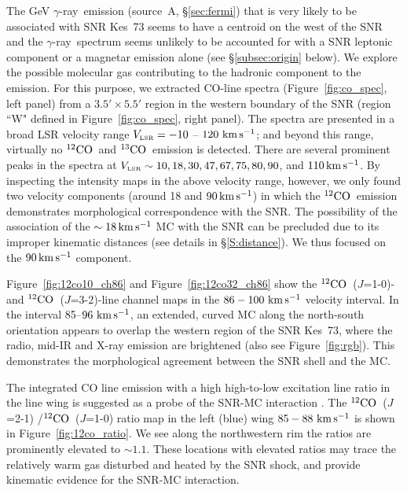 \documentclass[12pt,preprint]{aastex}
\newcommand{\ssst}{\scriptscriptstyle}
\newcommand{\kms}{\,{\km\ps}}       \newcommand{\m}{\,{\rm m}}
\newcommand{\VLSR}{V_{\ssst\rm LSR}}
\newcommand{\twCO}{$^{12}{\rm CO}$}
\newcommand{\thCO}{$^{13}{\rm CO}$}
\newcommand{\Jotz}{$J$=1-0}
\newcommand{\Jtto}{$J$=2-1}
\newcommand{\Jttt}{$J$=3-2}
\newcommand{\gray}{{\rm $\gamma$-ray}}
\begin{document}
The GeV \gray\ emission (source~A, \S\ref{sec:fermi}) 
that is very likely to be associated with SNR Kes~73
seems to have a centroid on the west of the SNR
and the \gray\ spectrum seems unlikely to be accounted for
with  a SNR leptonic component 
or a magnetar emission alone 
(see \S\ref{subsec:origin} below).
We explore the possible molecular gas contributing to the hadronic component
to the emission.
For this purpose, we extracted CO-line spectra (Figure~\ref{fig:co_spec}, left panel)
from a $3.5'\times5.5'$ region in the western boundary of the SNR (region ``W" defined in
Figure~\ref{fig:co_spec}, right panel).
The spectra are presented in a broad LSR velocity range
$\VLSR=-10$ -- $120\kms$; and
beyond this range, virtually no \twCO\ and \thCO\ emission is detected. 
There are several prominent peaks in the spectra at 
$\VLSR\sim10, 18, 30, 47, 67, 75, 80, 90$, and $110\,{\rm km}\,{\rm s}^{-1}$.
By inspecting the intensity maps in the above velocity range, however,
we only found two velocity components (around 18 and $90\,{\rm km}\,{\rm s}^{-1}$)
in which the \twCO\ emission demonstrates morphological correspondence with
the SNR.
The possibility of the association of the $\sim18\,{\rm km}\,{\rm s}^{-1}$ MC with the SNR can be
precluded due to its improper kinematic distances (see details in \S\ref{S:distance}).
We thus focused on the $90\,{\rm km}\,{\rm s}^{-1}$ component.

Figure~\ref{fig:12co10_ch86} and Figure~\ref{fig:12co32_ch86}
show the \twCO\ (\Jotz)- and \twCO~(\Jttt)-line channel maps
in the $86-100\kms$ velocity interval. %
In the interval 85--$96\kms$,  
an extended, curved MC along the north-south orientation appears to overlap
the western region of the SNR Kes~73, 
where the radio, mid-IR and X-ray emission are brightened
(also see Figure~\ref{fig:rgb}).
This demonstrates the morphological agreement between the SNR shell
and the MC.

The integrated CO line emission  with a high high-to-low excitation 
line ratio in the line wing is
suggested as a probe of the SNR-MC interaction 
\citep{Seta1998,Jiang20103c397,Chen2014IAU}.
The   \twCO~(\Jtto) /\twCO~(\Jotz) ratio map in the left (blue) wing $85-88\kms$ 
is shown in Figure~\ref{fig:12co_ratio}. 
We see along the northwestern rim the ratios are  prominently elevated to $\sim1.1$.
These locations  with elevated ratios may trace the relatively warm gas
disturbed and heated by the SNR shock, and provide kinematic evidence
for the SNR-MC interaction. 
\end{document}
